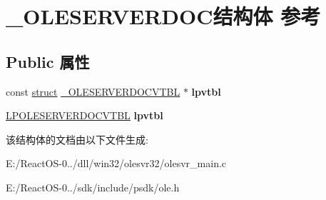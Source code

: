 \hypertarget{struct___o_l_e_s_e_r_v_e_r_d_o_c}{}\section{\+\_\+\+O\+L\+E\+S\+E\+R\+V\+E\+R\+D\+O\+C结构体 参考}
\label{struct___o_l_e_s_e_r_v_e_r_d_o_c}
\subsection*{Public 属性}
\begin{DoxyCompactItemize}
\item 
\mbox{\label{struct___o_l_e_s_e_r_v_e_r_d_o_c_a08c86124d3dc8f3eefd1b955f5ce2751}} 
const \hyperlink{interfacestruct}{struct} \hyperlink{struct___o_l_e_s_e_r_v_e_r_d_o_c_v_t_b_l}{\+\_\+\+O\+L\+E\+S\+E\+R\+V\+E\+R\+D\+O\+C\+V\+T\+BL} $\ast$ {\bfseries lpvtbl}
\item 
\mbox{\label{struct___o_l_e_s_e_r_v_e_r_d_o_c_aea9945bef7b9e12411f4d599656b40be}} 
\hyperlink{struct___o_l_e_s_e_r_v_e_r_d_o_c_v_t_b_l}{L\+P\+O\+L\+E\+S\+E\+R\+V\+E\+R\+D\+O\+C\+V\+T\+BL} {\bfseries lpvtbl}
\end{DoxyCompactItemize}


该结构体的文档由以下文件生成\+:\begin{DoxyCompactItemize}
\item 
E\+:/\+React\+O\+S-\/0../dll/win32/olesvr32/olesvr\+\_\+main.\+c\item 
E\+:/\+React\+O\+S-\/0../sdk/include/psdk/ole.\+h\end{DoxyCompactItemize}
